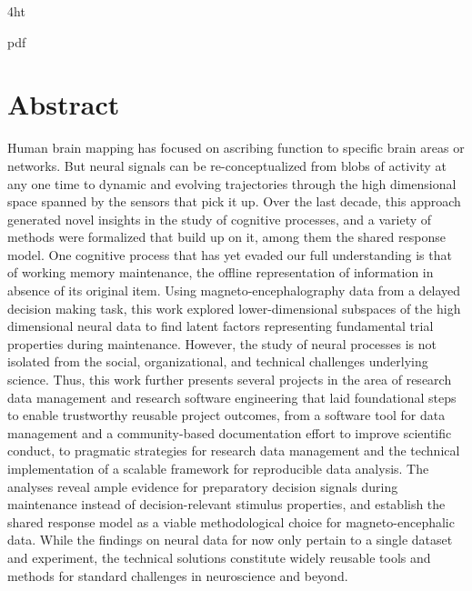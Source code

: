\documentclass[
  a4paper,  %
  twoside,  %
  bibliography=totoc,
  headsepline,
  cleardoublepage=empty,
  parskip=half,
  draft=false
]{scrbook}
\begin{document}
\iftex4ht
  \Configure{$}{\PicMath}{\EndPicMath}{}

  {pdf}
  {%
  }
\fi



\Titelblatt

\pagestyle{preamble}
\renewcommand*{\chapterpagestyle}{preamble}



\section*{Abstract}

Human brain mapping has focused on ascribing function to specific brain areas or networks.
But neural signals can be re-conceptualized from blobs of activity at any one time to dynamic and evolving trajectories through the high dimensional space spanned by the sensors that pick it up.
Over the last decade, this approach generated novel insights in the study of cognitive processes, and a variety of methods were formalized that build up on it, among them the shared response model.
One cognitive process that has yet evaded our full understanding is that of working memory maintenance, the offline representation of information in absence of its original item.
Using magneto-encephalography data from a delayed decision making task, this work explored lower-dimensional subspaces of the high dimensional neural data to find latent factors representing fundamental trial properties during maintenance.
However, the study of neural processes is not isolated from the social, organizational, and technical challenges underlying science.
Thus, this work further presents several projects in the area of research data management and research software engineering that laid foundational steps to enable trustworthy reusable project outcomes, from a software tool for data management and a community-based documentation effort to improve scientific conduct, to pragmatic strategies for research data management and the technical implementation of a scalable framework for reproducible data analysis.
The analyses reveal ample evidence for preparatory decision signals during maintenance instead of decision-relevant stimulus properties, and establish the shared response model as a viable methodological choice for magneto-encephalic data.
While the findings on neural data for now only pertain to a single dataset and experiment, the technical solutions constitute widely reusable tools and methods for standard challenges in neuroscience and beyond.
\end{document}
